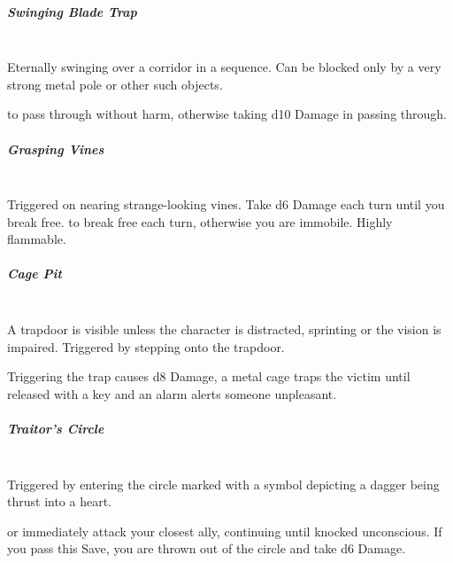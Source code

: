 \documentclass[itdr]{subfiles}
\begin{document}
\subparagraph{Swinging Blade Trap}~\\
Eternally swinging over a corridor in a sequence. Can be blocked only by a very strong metal pole or other such objects.

 to pass through without harm, otherwise taking d10 Damage in passing through.

\subparagraph{Grasping Vines}~\\
Triggered on nearing strange-looking vines. Take d6 Damage each turn until you break free.  to break free each turn, otherwise you are immobile. Highly flammable.

\subparagraph{Cage Pit}~\\
A trapdoor is visible unless the character is distracted, sprinting or the vision is impaired. Triggered by stepping onto the trapdoor.

Triggering the trap causes d8 Damage, a metal cage traps the victim until released with a key and an alarm alerts someone unpleasant.

\subparagraph{Traitor's Circle}~\\
Triggered by entering the circle marked with a symbol depicting a dagger being thrust into a heart.

 or immediately attack your closest ally, continuing until knocked unconscious. If you pass this Save, you are thrown out of the circle and take d6 Damage.
\end{document}

